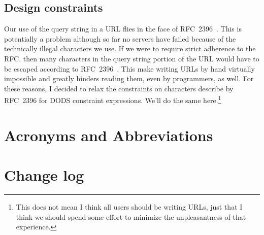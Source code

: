 \documentclass{article}
\begin{document}
\subsection{Design constraints}
Our use of the query string in a \ac{URL} flies in the face of
RFC~2396~\cite{rfc2396}.  This is potentially a problem although so far no
servers have failed because of the technically illegal characters we use. If
we were to require strict adherence to the RFC, then many characters in the
query string portion of the \ac{URL} would have to be escaped according to
RFC~2396~\cite{rfc2396}. This make writing URLs by hand virtually impossible
and greatly hinders reading them, even by programmers, as well. For these
reasons, I decided to relax the constraints on characters describe by
RFC~2396 for DODS constraint expressions. We'll do the same
here.\footnote{This does not mean I think all users should be writing URLs,
  just that I think we should spend some effort to minimize the
  unpleasantness of that experience.}

\raggedright




\appendix

\section{Acronyms and Abbreviations}
\begin{acronym}

\end{acronym}

\section{Change log}
\end{document}
